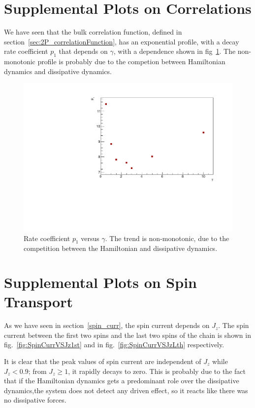 \section{Supplemental Plots on Correlations}
We have seen that the bulk correlation function, defined in section~\ref{sec:2P_correlationFunction}, has an exponential profile, with a decay rate coefficient $p_1$ that depends on $\gamma$, with a dependence shown in fig~\ref{fig:CFBulkCONN_p1vsGamma}. The non-monotonic profile is probably due to the competion between Hamiltonian dynamics and dissipative dynamics.

\begin{figure}[H]
    \centering
    \captionsetup{width=1.\linewidth}
    \includegraphics[scale=0.6]{Figures/CFBulkCONN_p1vsGamma.pdf}
    \caption{Rate coefficient $p_1$ versus $\gamma$. The trend is non-monotonic, due to the competition between the Hamiltonian and dissipative dynamics.}
    \label{fig:CFBulkCONN_p1vsGamma}
\end{figure}

\section{Supplemental Plots on Spin Transport}
As we have seen in section~\ref{spin_curr}, the spin current depends on $J_z$. The spin current between the first two spins and the last two spins of the chain is shown in fig.~\ref{fig:SpinCurrVSJz1st} and in fig.~\ref{fig:SpinCurrVSJzLth} respectively. 

It is clear that the peak values of spin current are independent of $J_z$ while $J_z < 0.9$; from $J_z \geq 1$, it rapidly decays to zero. This is probably due to the fact that if the Hamiltonian dynamics gets a predominant role over the dissipative dynamics,the system does not detect any driven effect, so it reacts like there was no dissipative forces.

